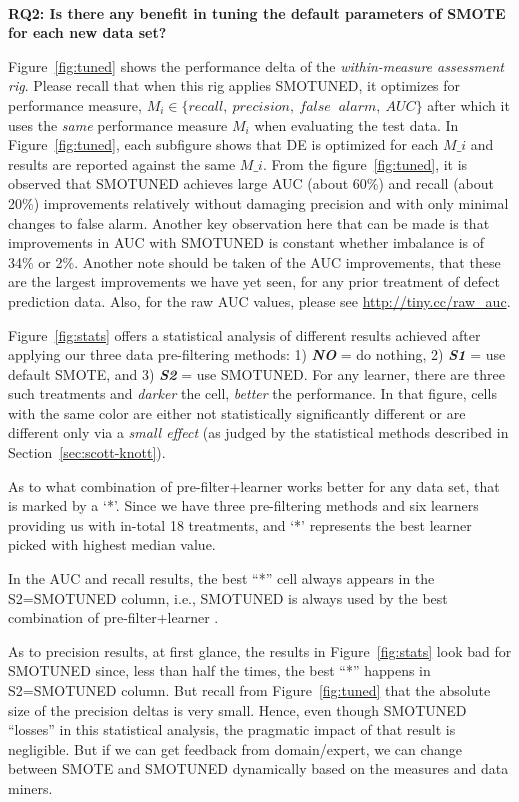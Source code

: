 \documentclass[sigconf]{acmart}
\theoremstyle{break}
\newcommand{\sma}{{\sc SMOTE}}
\newcommand{\smb}{{\sc SMOTUNED}}
\begin{document}
\noindent
{\bf \\RQ2: Is there any benefit in tuning the default parameters of SMOTE for each new data set?}

Figure~\ref{fig:tuned} shows the performance delta of the {\em within-measure assessment rig}.
Please recall that when this rig applies {\smb}, it optimizes for performance measure, $M_i \in \{recall,\ precision,\ false$ $\ alarm,\ AUC\}$
after which it uses the {\em same} performance measure
$M_i$ when evaluating the test data. In Figure~\ref{fig:tuned}, each subfigure shows that DE is optimized for each $M\_i$ and results are reported against the same $M\_i$.
From the figure~\ref{fig:tuned}, it is observed that
{\smb} achieves large AUC (about 60\%) and recall (about 20\%) improvements relatively
without
 damaging precision and  with only minimal changes
 to false alarm. Another key observation here that can be made is that improvements in AUC with {\smb} is constant whether imbalance is of 34\% or 2\%. Another note should be taken of the AUC improvements, that these are the largest improvements
 we have yet seen, for any prior treatment of defect prediction data. Also, for the raw AUC values, please see \url{http://tiny.cc/raw_auc}.

Figure~\ref{fig:stats} offers a statistical analysis
of different results achieved
after applying our three data pre-filtering methods: 1) {\em \textbf{NO}} = do nothing, 2) {\em \textbf{S1}} = use default {\sma}, and 3) {\em \textbf{S2}} = use {\smb}.
For any learner, there are three such treatments and {\em darker} the cell, {\em better} the performance. 
In that figure, cells with the same color are
either not statistically significantly different or
are different only via a {\em small effect}
(as judged by the statistical methods described in Section~\ref{sec:scott-knott}).

As to what combination of pre-filter+learner works better for any data set, that is marked by a `*'. Since we have three pre-filtering methods and six learners providing us with in-total 18 treatments, and `*' represents the best learner picked with highest median value.

In the  AUC and recall results,  the best ``*'' cell always appears in the S2={\smb} column, i.e.,  
 {\smb} is always
used by the best combination of pre-filter+learner .

As to precision  results,  at first glance, the  results in Figure~\ref{fig:stats} look bad for {\smb} since, less than half the times, 
the best ``*''  happens  in S2={\smb} column.
 But recall from Figure~\ref{fig:tuned} that the absolute size of the precision deltas is very small.  Hence, even though {\smb} ``losses'' in this statistical analysis, the pragmatic impact of that result  is  negligible. But if we can get feedback from domain/expert, we can change between {\sma} and {\smb} dynamically based on the measures and data miners.
 
\end{document}
